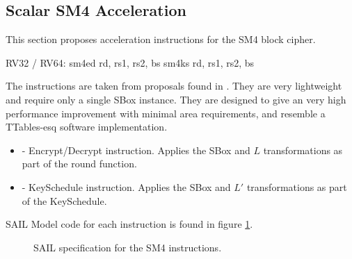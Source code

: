 
\newpage
\subsection{Scalar SM4 Acceleration}
\label{sec:scalar:sm4}

This section proposes acceleration instructions for
the SM4 block cipher\cite{block:sm4:1, ietf:sm4}.

\begin{cryptoisa}
RV32 / RV64:
    sm4ed     rd, rs1, rs2, bs
    sm4ks     rd, rs1, rs2, bs
\end{cryptoisa}

The instructions are taken from proposals found in \cite{MJS:LWAES:20}.
They are very lightweight and require only a single SBox instance.
They are designed to give an very high performance improvement with
minimal area requirements, and resemble a TTables-esq
software implementation.

\begin{itemize}
\item {} - Encrypt/Decrypt instruction. Applies the
    SBox and $L$ transformations as part of the round function.
\item {} - KeySchedule instruction. Applies the
    SBox and $L'$ transformations as part of the KeySchedule.
\end{itemize}

SAIL Model code for each instruction is found in figure
\ref{fig:sail:sm4}.

%
%
%


\begin{figure}[h]

\caption{SAIL specification for the SM4 instructions.}
\label{fig:sail:sm4}
\end{figure}
